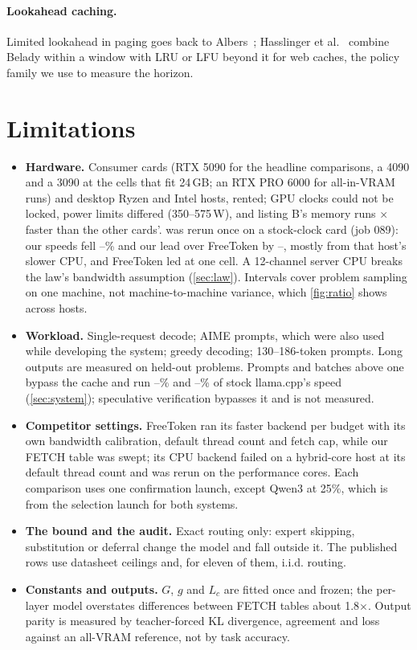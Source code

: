 \documentclass[10pt,twocolumn]{article}
\begin{document}
\paragraph{Lookahead caching.} Limited lookahead in paging goes back to Albers~\cite{albers1997lookahead}; Hasslinger et
al.~\cite{hasslinger2018} combine Belady within a window with LRU or LFU beyond it for web caches, the policy family we
use to measure the horizon.

\section{Limitations}\label{sec:limits}
\begin{itemize}\setlength\itemsep{1pt}
\item \textbf{Hardware.} Consumer cards (RTX 5090 for the headline comparisons, a 4090 and a 3090 at the cells that
fit 24\,GB; an RTX PRO 6000 for all-in-VRAM runs) and desktop Ryzen and Intel
hosts, rented; GPU clocks could not be locked, power limits differed (350--575\,W), and listing B's memory runs
\memClkRatio$\times$ faster than the other cards'.  was rerun once on a stock-clock card (job
089): our speeds fell \scOursDropMin--\scOursDropMax\% and our lead over FreeToken by
\scRatioDropMin--\scRatioDropMax, mostly from that host's slower CPU, and FreeToken led at one cell. A 12-channel server CPU breaks the
law's bandwidth assumption (\cref{sec:law}). Intervals cover problem sampling on one machine, not machine-to-machine
variance, which \cref{fig:ratio} shows across \ratioHostsN{} hosts.
\item \textbf{Workload.} Single-request decode; AIME prompts, which were also used while developing the system;
greedy decoding; 130--186-token prompts. Long outputs are measured on held-out problems. Prompts and batches above
one bypass the cache and run \bbPrefillMin--\bbPrefillMax\% and \bbBatchMin--\bbBatchMax\% of stock llama.cpp's
speed (\cref{sec:system}); speculative verification bypasses it and is not measured.
\item \textbf{Competitor settings.} FreeToken ran its faster backend per budget with its own bandwidth calibration,
default thread count and fetch cap, while our FETCH table was swept; its CPU backend failed on a hybrid-core host at its default
thread count and was rerun on the performance cores.
Each comparison uses one confirmation launch, except Qwen3 at 25\%, which is from the selection launch for both
systems.
\item \textbf{The bound and the audit.} Exact routing only: expert skipping, substitution or deferral change the model
and fall outside it. The published rows use datasheet ceilings and, for eleven of them, i.i.d. routing.
\item \textbf{Constants and outputs.} $G$, $g$ and $L_c$ are fitted once and frozen; the per-layer model overstates
differences between FETCH tables about 1.8$\times$. Output parity is measured by teacher-forced KL divergence, agreement and loss
against an all-VRAM reference, not by task accuracy.
\end{itemize}
\end{document}
